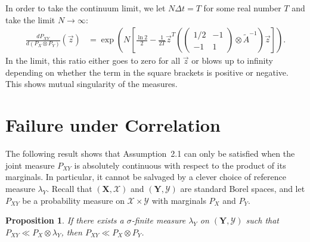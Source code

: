 \documentclass[12pt]{amsart}
\newtheorem{proposition}[theorem]{Proposition}
\theoremstyle{definition}
\theoremstyle{remark}
\newcommand{\ms}[1]{(\mathbf{#1},\mathcal{#1})}
\begin{document}
In order to take the continuum limit, we let $N\Delta t = T$ for some real number $T$ and take the limit $N\to\infty$:
\begin{align}
    \frac{dP_{XY}}{d(P_X\otimes P_Y)}(\vec{z}) &= \exp\left(N\left[\frac{\ln2}{2}-\frac{1}{2T}\vec{z}^T\left(\begin{pmatrix}
        1/2&-1\\-1&1
    \end{pmatrix}\otimes \tilde{A}^{-1}\right)\vec{z}\right]\right).
\end{align}
In the limit, this ratio either goes to zero for all $\vec{z}$ or blows up to infinity depending on whether the term in the square brackets is positive or negative. This shows mutual singularity of the measures.

\section{Failure under Correlation}

The following result shows that Assumption~2.1 can only be satisfied when the joint measure $P_{XY}$ is absolutely continuous with respect to the product of its marginals. In particular, it cannot be salvaged by a clever choice of reference measure $\lambda_Y$.     Recall that $\ms{X}$ and $\ms{Y}$ are standard Borel spaces, and let $P_{XY}$ be a probability measure on $\mathcal{X} \times \mathcal{Y}$ with marginals $P_X$ and $P_Y$.
\begin{proposition}\label{prop:abstract}
    If there exists a $\sigma$-finite measure $\lambda_Y$ on $(\mathbf{Y}, \mathcal{Y})$ such that $P_{XY} \ll P_X \otimes \lambda_Y$, then $P_{XY} \ll P_X \otimes P_Y$.
\end{proposition}
\end{document}
